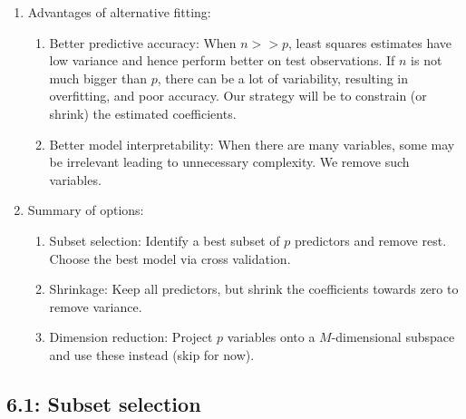 \documentclass{article}
\begin{document}
\begin{enumerate}
\item Advantages of alternative fitting:
\begin{enumerate}
\item Better predictive accuracy: When $n >>p$, least squares estimates have low variance and hence perform better on test observations. If $n$ is not much bigger than $p$, there can be a lot of variability, resulting in overfitting, and poor accuracy. Our strategy will be to constrain (or shrink) the estimated coefficients. 

\item Better model interpretability: When there are many variables, some may be irrelevant leading to unnecessary complexity. We remove such variables.
\end{enumerate}

\item Summary of options:
\begin{enumerate}
\item Subset selection: Identify a best subset of $p$ predictors and remove rest. Choose the best model via cross validation.
\item Shrinkage: Keep all predictors, but shrink the coefficients towards zero to remove variance. 
\item Dimension reduction: Project $p$ variables onto a $M$-dimensional subspace and use these instead (skip for now).
\end{enumerate}
\end{enumerate}

\subsection*{6.1: Subset selection}
\end{document}
